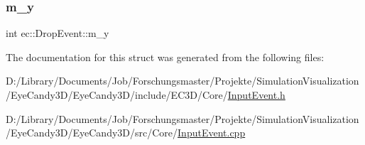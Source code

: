 \mbox{\label{structec_1_1_drop_event_a59338dd4b8cd47b7f025908a63be2e92}} 
\subsubsection{\texorpdfstring{m\+\_\+y}{m\_y}}
{\footnotesize\ttfamily int ec\+::\+Drop\+Event\+::m\+\_\+y}



The documentation for this struct was generated from the following files\+:\begin{DoxyCompactItemize}
\item 
D\+:/\+Library/\+Documents/\+Job/\+Forschungsmaster/\+Projekte/\+Simulation\+Visualization/\+Eye\+Candy3\+D/\+Eye\+Candy3\+D/include/\+E\+C3\+D/\+Core/\mbox{\hyperlink{_input_event_8h}{Input\+Event.\+h}}\item 
D\+:/\+Library/\+Documents/\+Job/\+Forschungsmaster/\+Projekte/\+Simulation\+Visualization/\+Eye\+Candy3\+D/\+Eye\+Candy3\+D/src/\+Core/\mbox{\hyperlink{_input_event_8cpp}{Input\+Event.\+cpp}}\end{DoxyCompactItemize}
